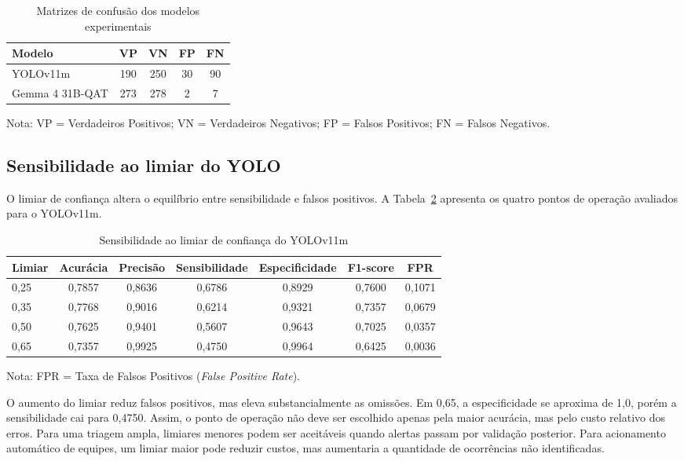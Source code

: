\documentclass[kdmile,a4paper]{kdmile}
\begin{document}
\begin{table}[htbp]
\centering
\footnotesize
\caption{Matrizes de confusão dos modelos experimentais}
\label{tab:confusao}
\begin{tabular}{lcccc}
\toprule
\textbf{Modelo} & \textbf{VP} & \textbf{VN} & \textbf{FP} & \textbf{FN} \\
\midrule
YOLOv11m & 190 & 250 & 30 & 90 \\
Gemma 4 31B-QAT & 273 & 278 & 2 & 7 \\
\bottomrule
\end{tabular}
\par\smallskip\raggedright
\scriptsize Nota: VP = Verdadeiros Positivos; VN = Verdadeiros Negativos; FP = Falsos Positivos; FN = Falsos Negativos.
\end{table}

\subsection{Sensibilidade ao limiar do YOLO}
\label{sec:sensibilidade-limiar}

O limiar de confiança altera o equilíbrio entre sensibilidade e falsos positivos. A Tabela~\ref{tab:limiar_yolo} apresenta os quatro pontos de operação avaliados para o YOLOv11m.

\begin{table}[htbp]
\centering
\footnotesize
\caption{Sensibilidade ao limiar de confiança do YOLOv11m}
\label{tab:limiar_yolo}
\begin{tabular}{lcccccc}
\toprule
\textbf{Limiar} & \textbf{Acurácia} & \textbf{Precisão} & \textbf{Sensibilidade} & \textbf{Especificidade} & \textbf{F1-score} & \textbf{FPR} \\
\midrule
0,25 & 0,7857 & 0,8636 & 0,6786 & 0,8929 & 0,7600 & 0,1071 \\
0,35 & 0,7768 & 0,9016 & 0,6214 & 0,9321 & 0,7357 & 0,0679 \\
0,50 & 0,7625 & 0,9401 & 0,5607 & 0,9643 & 0,7025 & 0,0357 \\
0,65 & 0,7357 & 0,9925 & 0,4750 & 0,9964 & 0,6425 & 0,0036 \\
\bottomrule
\end{tabular}
\par\smallskip\raggedright
\scriptsize Nota: FPR = Taxa de Falsos Positivos (\emph{False Positive Rate}).
\end{table}

O aumento do limiar reduz falsos positivos, mas eleva substancialmente as omissões. Em 0,65, a especificidade se aproxima de 1,0, porém a sensibilidade cai para 0,4750. Assim, o ponto de operação não deve ser escolhido apenas pela maior acurácia, mas pelo custo relativo dos erros. Para uma triagem ampla, limiares menores podem ser aceitáveis quando alertas passam por validação posterior. Para acionamento automático de equipes, um limiar maior pode reduzir custos, mas aumentaria a quantidade de ocorrências não identificadas.
\end{document}
